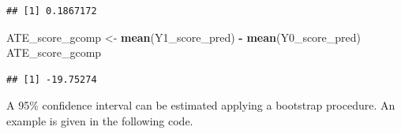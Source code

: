 \documentclass[
]{book}
\newenvironment{Shaded}{\begin{snugshade}}{\end{snugshade}}
\newcommand{\FunctionTok}[1]{\textcolor[rgb]{0.13,0.29,0.53}{\textbf{#1}}}
\newcommand{\NormalTok}[1]{#1}
\newcommand{\OtherTok}[1]{\textcolor[rgb]{0.56,0.35,0.01}{#1}}
\newcommand{\SpecialCharTok}[1]{\textcolor[rgb]{0.81,0.36,0.00}{\textbf{#1}}}
\begin{document}
\begin{verbatim}
## [1] 0.1867172
\end{verbatim}

\begin{Shaded}
\begin{Highlighting}[]
\NormalTok{ATE\_score\_gcomp }\OtherTok{\textless{}{-}} \FunctionTok{mean}\NormalTok{(Y1\_score\_pred) }\SpecialCharTok{{-}} \FunctionTok{mean}\NormalTok{(Y0\_score\_pred)}
\NormalTok{ATE\_score\_gcomp}
\end{Highlighting}
\end{Shaded}

\begin{verbatim}
## [1] -19.75274
\end{verbatim}

A 95\% confidence interval can be estimated applying a bootstrap procedure. An example is given in the following code.
\end{document}
